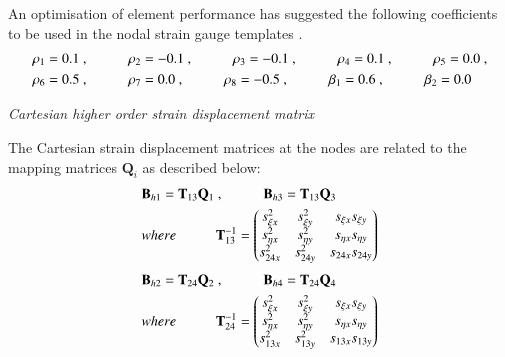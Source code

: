An optimisation of element performance has suggested the following coefficients to be used in the nodal strain gauge templates \cite{Hau94}. 
\begin{gather} 
	\begin{aligned}
		&\rho_1 = 0.1\ ,
		\hspace{10mm}
		\rho_2 = -0.1\ ,
		\hspace{10mm}
		\rho_3 = -0.1\ ,
		\hspace{10mm}
		\rho_4 = 0.1\ ,
		\hspace{10mm}
		\rho_5 = 0.0\ , \\
		&\rho_6 = 0.5\ ,
		\hspace{10mm}
		\rho_7 = 0.0\ ,
		\hspace{10mm}
		\rho_8 = -0.5\ ,
		\hspace{10mm}
		\beta_1 = 0.6\ ,
		\hspace{10mm}
		\beta_2 = 0.0
		\label{equation16}
	\end{aligned}
\end{gather}

\textit{Cartesian higher order strain displacement matrix}

The Cartesian strain displacement matrices at the nodes are related to the mapping matrices $\mathbf{Q}_i$ as described below:
\begin{gather} 
	\begin{aligned}
		&\mathbf{B}_{h1} = \mathbf{T}_{13}  \mathbf{Q}_{1}\ ,
		\hspace{10mm}
		\mathbf{B}_{h3} = \mathbf{T}_{13}  \mathbf{Q}_{3}\\
		&where 
		\hspace{10mm} 
		\mathbf{T}_{13}^{-1} =
		\begin{pmatrix}
			s_{\xi x}^2 & s_{\xi y}^2 & s_{\xi x} s_{\xi y} \\
			s_{\eta x}^2 & s_{\eta y}^2 & s_{\eta x} s_{\eta y} \\
			s_{24 x}^2 & s_{24 y}^2 & s_{24 x} s_{24 y}
		\end{pmatrix}
		\label{equation17}
	\end{aligned}
\end{gather}
\begin{gather} 
	\begin{aligned}
		&\mathbf{B}_{h2} = \mathbf{T}_{24}  \mathbf{Q}_{2}\ ,
		\hspace{10mm}
		\mathbf{B}_{h4} = \mathbf{T}_{24}  \mathbf{Q}_{4}\\
		&where 
		\hspace{10mm} 
		\mathbf{T}_{24}^{-1} =
		\begin{pmatrix}
			s_{\xi x}^2 & s_{\xi y}^2 & s_{\xi x} s_{\xi y} \\
			s_{\eta x}^2 & s_{\eta y}^2 & s_{\eta x} s_{\eta y} \\
			s_{13 x}^2 & s_{13 y}^2 & s_{13 x} s_{13 y}
		\end{pmatrix}
		\label{equation18}
	\end{aligned}
\end{gather}

